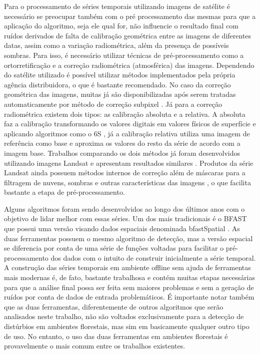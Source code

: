 \documentclass[12pt,a4paper]{article}
\begin{document}
Para o processamento de séries temporais utilizando imagens de satélite é necessário se preocupar também com o pré processamento das mesmas para que a aplicação do algoritmo, seja ele qual for, não influencie o resultado final com ruídos derivados de falta de calibração geométrica entre as imagens de diferentes datas, assim como a variação radiométrica, além da presença de possíveis sombras. Para isso, é necessário utilizar técnicas de pré-processamento como a ortorretificação e a correção radiométrica (atmosférica) das imagens. Dependendo do satélite utilizado é possível utilizar métodos implementados pela própria agência distribuidora, o que é bastante recomendado. No caso da correção geométrica das imagens, muitas já são disponibilizadas após serem tratadas automaticamente por método de correção subpixel \citep{Gutjahr2014}. Já para a correção radiométrica existem dois tipos: as calibração absoluta e a relativa. A absoluta faz a calibração transformando os valores digitais em valores físicos de superfície e aplicando algoritmos como o 6S \citep{Sagan2004}, já a calibração relativa utiliza uma imagem de referência como base e aproxima os valores do resto da série de acordo com a imagem base. Trabalhos comparando os dois métodos já foram desenvolvidos utilizando imagens Landsat e apresentam resultados similares \citep{Chen2010}. Produtos da série Landsat ainda possuem métodos internos de correção além de máscaras para a filtragem de nuvens, sombras e outras características das imagens \citep{ZHU2015269, ZHU201283, Huang2010}, o que facilita bastante a etapa de pré-processamento.

Alguns algoritmos foram sendo desenvolvidos ao longo dos últimos anos com o objetivo de lidar melhor com essas séries. Um dos mais tradicionais é o BFAST \sloppy  \citep{VERBESSELT2010106, VERBESSELT20102970, VERBESSELT201298} que possui uma versão visando dados espaciais denominada bfastSpatial \citep{bfastSpatial}. As duas ferramentas possuem o mesmo algoritmo de detecção, mas a versão espacial se diferencia por conta de uma série de funções voltadas para facilitar o pré-processamento dos dados com o intuito de construir inicialmente a série temporal. A construção das séries temporais em ambiente offline sem ajuda de ferramentas mais modernas é, de fato, bastante trabalhosa e contém muitas etapas necessárias para que a análise final possa ser feita sem maiores problemas e sem a geração de ruídos por conta de dados de entrada problemáticos. É importante notar também que as duas ferramentas, diferentemente de outros algoritmos que serão analisados neste trabalho, não são voltados exclusivamente para a detecção de distúrbios em ambientes florestais,  mas sim em basicamente qualquer outro tipo de uso. No entanto, o uso das duas ferramentas em ambientes florestais é provavelmente o mais comum entre os trabalhos existentes. 
\end{document}
